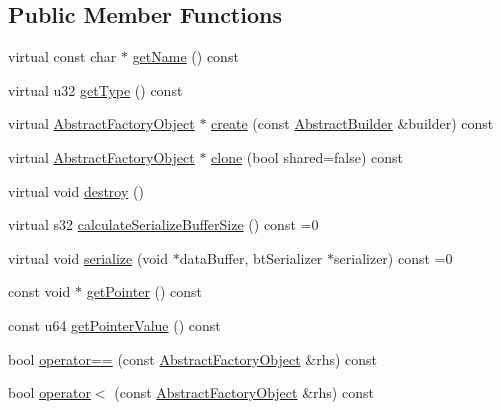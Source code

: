 \subsection*{Public Member Functions}
\begin{DoxyCompactItemize}
\item 
virtual const char $\ast$ \hyperlink{classjli_1_1_abstract_factory_object_ab78cb20b22a26275e80a1dd33566024c}{get\+Name} () const 
\item 
virtual u32 \hyperlink{classjli_1_1_abstract_factory_object_a1a69b8811cdf0ccc7facb9b1cb396aae}{get\+Type} () const 
\item 
virtual \hyperlink{classjli_1_1_abstract_factory_object}{Abstract\+Factory\+Object} $\ast$ \hyperlink{classjli_1_1_abstract_factory_object_af2f25dcc27827022294a2078ef35b9d3}{create} (const \hyperlink{classjli_1_1_abstract_builder}{Abstract\+Builder} \&builder) const 
\item 
virtual \hyperlink{classjli_1_1_abstract_factory_object}{Abstract\+Factory\+Object} $\ast$ \hyperlink{classjli_1_1_abstract_factory_object_a1884315c8cd248335161e6f52a3519de}{clone} (bool shared=false) const 
\item 
virtual void \hyperlink{classjli_1_1_abstract_factory_object_a40ffbc527e0d7e3d5a6adf241a63ac25}{destroy} ()
\item 
virtual s32 \hyperlink{classjli_1_1_abstract_factory_object_a37d06a25aaf9400a2f5b0a7ee110b236}{calculate\+Serialize\+Buffer\+Size} () const =0
\item 
virtual void \hyperlink{classjli_1_1_abstract_factory_object_a9971edc5976c06cbfae1b0ae80722a43}{serialize} (void $\ast$data\+Buffer, bt\+Serializer $\ast$serializer) const =0
\item 
const void $\ast$ \hyperlink{classjli_1_1_abstract_factory_object_aa32d6469cb7cc3dab360993a7e1a276e}{get\+Pointer} () const 
\item 
const u64 \hyperlink{classjli_1_1_abstract_factory_object_ab96c5857b75e6446fa38e056fefd7052}{get\+Pointer\+Value} () const 
\item 
bool \hyperlink{classjli_1_1_abstract_factory_object_a0dffe2fef49472131fdc99a04a16aa00}{operator==} (const \hyperlink{classjli_1_1_abstract_factory_object}{Abstract\+Factory\+Object} \&rhs) const 
\item 
bool \hyperlink{classjli_1_1_abstract_factory_object_aba24919cc7fa9fee04ed0b6bbeaee0e9}{operator$<$} (const \hyperlink{classjli_1_1_abstract_factory_object}{Abstract\+Factory\+Object} \&rhs) const 
\item 

\end{DoxyCompactItemize}
